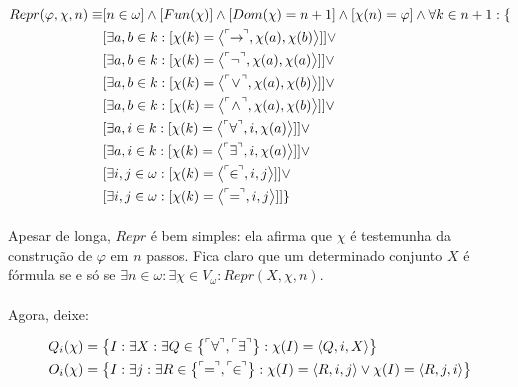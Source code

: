         \begin{align*}
            Repr(\varphi, \chi, n) \equiv &[n \in \omega] \land [Fun(\chi)] \land [Dom(\chi) = n+1] \land [\chi(n) = \varphi] \land \forall k\in n+1:\{\\
                &[\exists a,b  \in k     : [\chi(k) = \TUPLE{ \FMLA{\!\!\rar\!\!} }{\chi(a)}{\chi(b)}] ] \lor \\
                &[\exists a,b  \in k     : [\chi(k) = \TUPLE{ \FMLA{\neg}         }{\chi(a)}{\chi(a)}] ] \lor \\
                &[\exists a,b  \in k     : [\chi(k) = \TUPLE{ \FMLA{  \!\lor\!  } }{\chi(a)}{\chi(b)}] ] \lor \\
                &[\exists a,b  \in k     : [\chi(k) = \TUPLE{ \FMLA{  \!\land\!  }}{\chi(a)}{\chi(b)}] ] \lor \\
                &[\exists a,i  \in k     : [\chi(k) = \TUPLE{ \FMLA{\forall}      }{   i   }{\chi(a)}] ] \lor \\
                &[\exists a,i  \in k     : [\chi(k) = \TUPLE{ \FMLA{\exists}      }{   i   }{\chi(a)}] ] \lor \\
                &[\exists i, j \in \omega: [\chi(k) = \TUPLE{ \FMLA{\!\!\in\!\!}  }{   i   }{   j   }] ] \lor \\
                &[\exists i, j \in \omega: [\chi(k) = \TUPLE{ \FMLA{\!\! = \!\!}  }{   i   }{   j   }] ] \}
        \end{align*}

        \paragraph{}
            Apesar de longa, $Repr$ é bem simples: ela afirma que $\chi$ é testemunha da construção de $\varphi$ em $n$ passos. Fica claro que 
            um determinado conjunto $X$ é fórmula se e só se $\exists n\in\omega:\exists \chi \in V_\omega: Repr(X, \chi, n)$. 

        \paragraph{}
            Agora, deixe:

        \begin{align*}
            Q_i(\chi) &= \SET{ I : \exists X: \exists Q\in\SET{\FMLA{ \forall },\FMLA{  \exists  }}: \chi(I) = \TUPLE{Q}{i}{X}}\\
            O_i(\chi) &= \SET{ I : \exists j: \exists R\in\SET{\FMLA{\!\!=\!\!},\FMLA{\!\!\in\!\!}}: \chi(I) = \TUPLE{R}{i}{j} \lor \chi(I) = \TUPLE{R}{j}{i}}
        \end{align*}

